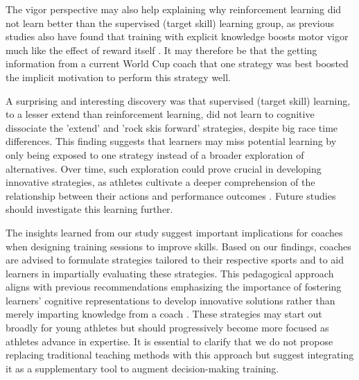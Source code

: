 \documentclass[pdflatex,sn-mathphys-num]{sn-jnl}%
\theoremstyle{thmstyleone}%
\theoremstyle{thmstyletwo}%
\theoremstyle{thmstylethree}%
\begin{document}
The vigor perspective may also help explaining why reinforcement learning did not learn better than the supervised (target skill) learning group, as previous studies also have found that training with explicit knowledge boosts motor vigor much like the effect of reward itself \cite{anderson_rewards_2020, wong_explicit_2015}. It may therefore be that the getting information from a current World Cup coach that one strategy was best boosted the implicit motivation to perform this strategy well. 

A surprising and interesting discovery was that supervised (target skill) learning, to a lesser extend than reinforcement learning, did not learn to cognitive dissociate the 'extend' and 'rock skis forward' strategies, despite big race time differences. This finding suggests that learners may miss potential learning by only being exposed to one strategy instead of a broader exploration of alternatives. Over time, such exploration could prove crucial in developing innovative strategies, as athletes cultivate a deeper comprehension of the relationship between their actions and performance outcomes \cite{ericsson_scientific_1998}. Future studies should investigate this learning further. 

The insights learned from our study suggest important implications for coaches when designing training sessions to improve skills. Based on our findings, coaches are advised to formulate strategies tailored to their respective sports and to aid learners in impartially evaluating these strategies. This pedagogical approach aligns with previous recommendations emphasizing the importance of fostering learners' cognitive representations to develop innovative solutions rather than merely imparting knowledge from a coach \cite{ericsson_scientific_1998}. These strategies may start out broadly for young athletes but should progressively become more focused as athletes advance in expertise. It is essential to clarify that we do not propose replacing traditional teaching methods with this approach but suggest integrating it as a supplementary tool to augment decision-making training.
\end{document}
